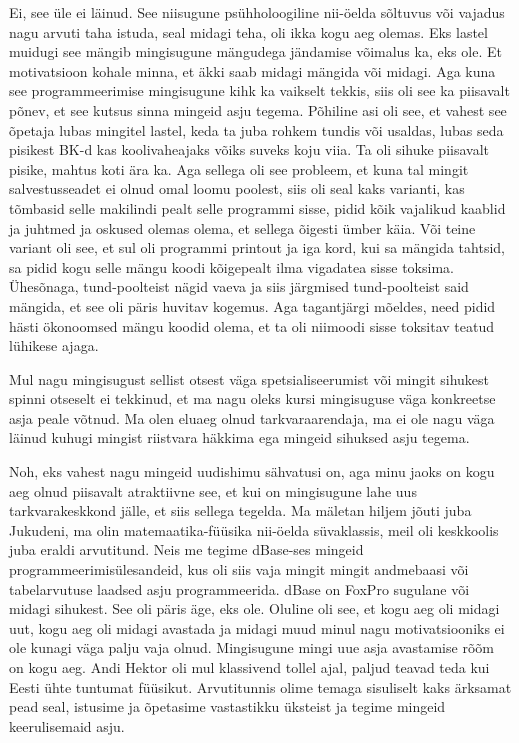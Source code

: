 Ei, see üle ei läinud. See niisugune psühholoogiline nii-öelda sõltuvus või vajadus nagu arvuti taha istuda, seal midagi teha, oli ikka kogu aeg olemas. Eks lastel muidugi see mängib mingisugune mängudega jändamise võimalus ka,  eks ole. Et motivatsioon kohale minna, et äkki saab midagi mängida või midagi. Aga kuna see programmeerimise mingisugune kihk ka vaikselt tekkis, siis oli see ka piisavalt põnev, et see kutsus sinna mingeid asju tegema. Põhiline asi oli see, et vahest see õpetaja lubas mingitel lastel, keda ta juba rohkem tundis või usaldas, lubas seda pisikest BK-d kas koolivaheajaks võiks suveks koju viia. Ta oli sihuke  piisavalt pisike, mahtus koti ära ka. Aga sellega oli see probleem, et kuna tal mingit salvestusseadet ei olnud omal loomu poolest, siis oli seal kaks varianti, kas tõmbasid selle makilindi pealt selle programmi sisse, pidid kõik vajalikud kaablid ja juhtmed ja oskused olemas olema, et sellega õigesti ümber käia. Või teine variant oli see, et sul oli programmi printout ja iga kord, kui sa mängida tahtsid, sa pidid kogu selle mängu koodi kõigepealt ilma vigadatea sisse toksima. Ühesõnaga, tund-poolteist nägid vaeva ja siis järgmised tund-poolteist said mängida, et see oli päris huvitav kogemus. Aga tagantjärgi mõeldes, need pidid hästi ökonoomsed mängu koodid olema, et ta oli niimoodi sisse toksitav teatud lühikese ajaga. 


Mul nagu mingisugust sellist otsest väga spetsialiseerumist või mingit sihukest spinni otseselt ei tekkinud, et ma nagu oleks kursi mingisuguse väga konkreetse asja peale võtnud. Ma olen eluaeg olnud tarkvaraarendaja,  ma ei ole nagu väga läinud kuhugi mingist riistvara häkkima ega mingeid sihuksed asju tegema. 


Noh, eks vahest nagu mingeid uudishimu sähvatusi on, aga minu jaoks on kogu aeg olnud piisavalt atraktiivne see, et kui on mingisugune lahe uus  tarkvarakeskkond jälle, et siis sellega tegelda. Ma mäletan hiljem jõuti juba Jukudeni, ma olin matemaatika-füüsika nii-öelda süvaklassis, meil oli keskkoolis juba eraldi arvutitund. Neis me tegime dBase-ses mingeid programmeerimisülesandeid, kus oli siis vaja mingit mingit andmebaasi või tabelarvutuse laadsed asju  programmeerida. dBase on FoxPro sugulane või midagi sihukest. See oli päris äge, eks ole. Oluline oli see, et kogu aeg oli midagi uut, kogu aeg oli midagi avastada ja midagi muud minul nagu  motivatsiooniks ei ole kunagi väga palju vaja olnud. Mingisugune mingi uue asja avastamise rõõm on kogu aeg. Andi Hektor oli mul klassivend tollel ajal, paljud teavad teda kui Eesti ühte tuntumat füüsikut. Arvutitunnis olime temaga sisuliselt kaks ärksamat pead seal, istusime ja õpetasime vastastikku üksteist ja tegime mingeid keerulisemaid asju. 

